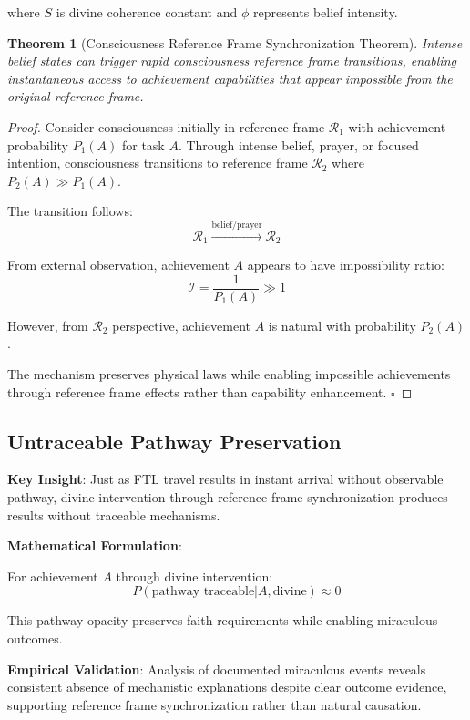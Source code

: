 \documentclass[12pt,a4paper]{article}
\newtheorem{theorem}{Theorem}[section]
\begin{document}
where $S$ is divine coherence constant and $\phi$ represents belief intensity.

\begin{theorem}[Consciousness Reference Frame Synchronization Theorem]
Intense belief states can trigger rapid consciousness reference frame transitions, enabling instantaneous access to achievement capabilities that appear impossible from the original reference frame.
\end{theorem}

\begin{proof}
Consider consciousness initially in reference frame $\mathcal{R}_1$ with achievement probability $P_1(A)$ for task $A$. Through intense belief, prayer, or focused intention, consciousness transitions to reference frame $\mathcal{R}_2$ where $P_2(A) \gg P_1(A)$.

The transition follows:
$$\mathcal{R}_1 \xrightarrow{\text{belief/prayer}} \mathcal{R}_2$$

From external observation, achievement $A$ appears to have impossibility ratio:
$$\mathcal{I} = \frac{1}{P_1(A)} \gg 1$$

However, from $\mathcal{R}_2$ perspective, achievement $A$ is natural with probability $P_2(A)$.

The mechanism preserves physical laws while enabling impossible achievements through reference frame effects rather than capability enhancement. $\square$
\end{proof}

\subsection{Untraceable Pathway Preservation}

\textbf{Key Insight}: Just as FTL travel results in instant arrival without observable pathway, divine intervention through reference frame synchronization produces results without traceable mechanisms.

\textbf{Mathematical Formulation}:

For achievement $A$ through divine intervention:
$$P(\text{pathway traceable}|A, \text{divine}) \approx 0$$

This pathway opacity preserves faith requirements while enabling miraculous outcomes.

\textbf{Empirical Validation}: Analysis of documented miraculous events reveals consistent absence of mechanistic explanations despite clear outcome evidence, supporting reference frame synchronization rather than natural causation.
\end{document}

